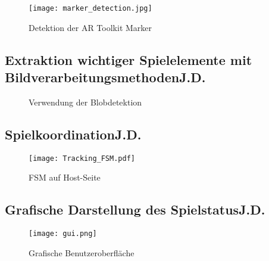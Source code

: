 \begin{figure}
	\begin{center}
		\texttt{[image: marker\_detection.jpg]} 	
		\caption{Detektion der AR Toolkit Marker}
		\label{fig:marker_detection}
	\end{center}
\end{figure}

\subsection[Extraktion wichtiger Spielelemente mit Bildverarbeitungsmethoden]{Extraktion wichtiger Spielelemente mit Bildverarbeitungsmethoden\hfill {\normalsize J.D.}} %
\begin{figure}
	\begin{center}
		\caption{Verwendung der Blobdetektion}
	\end{center}
\end{figure}

\subsection[Spielkoordination]{Spielkoordination\hfill {\normalsize J.D.}} %
\begin{figure}
	\begin{center}
		\texttt{[image: Tracking\_FSM.pdf]} 	
		\caption{FSM auf Host-Seite}
		\label{fig:fsm-host}
	\end{center}
\end{figure}

\subsection[Grafische Darstellung des Spielstatus]{Grafische Darstellung des Spielstatus\hfill {\normalsize J.D.}} %

\begin{figure}
	\begin{center}
		\texttt{[image: gui.png]} 	
		\caption{Grafische Benutzeroberfläche}
		\label{fig:gui}
	\end{center}
\end{figure}
